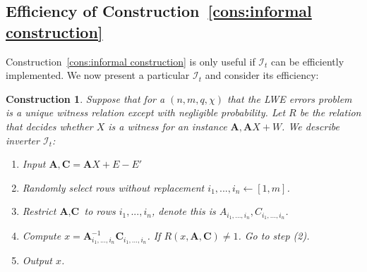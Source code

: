 \documentclass[11pt]{article}
\newcommand{\consref}[1]{\mbox{Construction~\ref{#1}}}
\newcommand{\class}[1]{{\ensuremath{\mathsf{#1}}}}
\newcommand{\gen}{\ensuremath{\class{Gen}}\xspace}
\newcommand{\rep}{\ensuremath{\class{Rep}}\xspace}
\newcommand{\vect}[1]{\ensuremath{\textbf{#1}}}
\newcommand{\Fq}{\ensuremath{\mathbb{F}_q}}
\newcommand{\sample}{\ensuremath{\class{Sample}}\xspace}
\newtheorem{construction}[theorem]{Construction}
\newcommand{\vA}{\vect{A}}
\begin{document}

\subsection{Efficiency of \consref{cons:informal construction}}
\label{sec:time main construction}
\consref{cons:informal construction} is only useful if $\mathcal{I}_t$ can be efficiently implemented.  We now present a particular $\mathcal{I}_t$ and consider its efficiency:

\begin{construction}
\label{cons:decoding algorithm} Suppose that for a $(n, m, q, \chi)$ that the LWE errors problem is a unique witness relation except with negligible probability.  Let $R$ be the relation that decides whether $X$ is a witness for an instance $\vA, \vA X+W$.  We describe inverter $\mathcal{I}_t$:
\begin{enumerate}
\item Input $\vA , \vect{C} = \vA X + E - E'$
\item Randomly select rows without replacement $i_1,..., i_n\leftarrow [1,m]$.  
\item Restrict $\vA, \vect{C}$ to rows $i_1,...,i_n$, denote this is $A_{i_1,...,i_n}, C_{i_1,...,i_n}$.
\item Compute $x = \vA^{-1}_{i_1,...,i_n}\vect{C}_{i_1,...,i_n}$.  If $R(x, \vA, \vect{C}) \neq 1$.  Go to step (2).
\item Output $x$.
\end{enumerate}
\end{construction}
\end{document}
